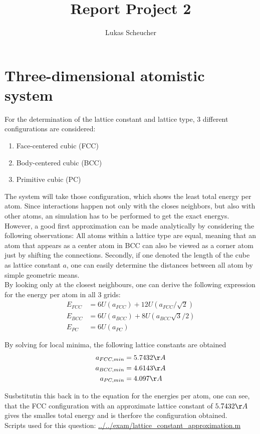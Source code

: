 \documentclass[10pt,a4paper]{report}
\title{Report Project 2}
\author{Lukas Scheucher}
\begin{document}
\chapter{Three-dimensional atomistic system}
For the determination of the lattice constant and lattice type, 3 different configurations are considered:
\begin{enumerate}
\item Face-centered cubic (FCC)
\item Body-centered cubic (BCC)
\item Primitive cubic     (PC)
\end{enumerate}
The system will take those configuration, which shows the least total energy per atom. Since interactions happen not only with the closes neighbors, but also with other atoms, an simulation has to be performed to get the exact energys.\\
However, a good first approximation can be made analytically by considering the following observations: All atoms within a lattice type are equal, meaning that an atom that appears as a center atom in BCC can also be viewed as a corner atom just by shifting the connections. Secondly, if one denoted the length of the cube as lattice constant $a$, one can easily determine the distances between all atom by simple geometric means.\\
By looking only at the closest neighbours, one can derive the following expression for the energy per atom in all 3 grids:
\begin{align}
E_{FCC}&=6 U(a_{FCC})+12 U(a_{FCC}/\sqrt{2}) \\
E_{BCC}&=6 U(a_{BCC})+8 U(a_{BCC} \sqrt{3}/2) \\
E_{PC} &=6 U(a_{PC})
\end{align}

By solving for local minima, the following lattice constants are obtained
\begin{align}
a_{FCC,min}&= 5.7432\AA\\
a_{BCC,min}&= 4.6143\AA\\
a_{PC,min} &= 4.097\AA\\
\end{align}

Susbstitutin this back in to the equation for the energies per atom, one can see, that the FCC configuration with an approximate lattice constant of $5.7432\AA$ gives the smalles total energy and is therfore the configuration obtained.\\

Scripts used for this question:
\url{../../exam/lattice_constant_approximation.m}
\
\end{document}
